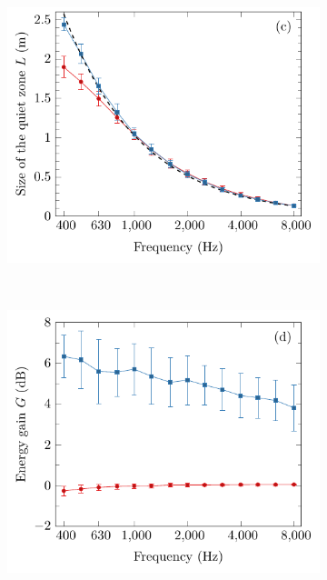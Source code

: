 \begin{figure}[!htb]
\begin{subfigure}{0.32\textwidth}
        \centering
        \includegraphics[width = \textwidth]{fig/200404B_size_v2}
    \end{subfigure}
    \\
    \begin{subfigure}{0.32\textwidth}
        \centering
        \includegraphics[width = \textwidth]{fig/200404A_gain_v2}
    \end{subfigure}
    \begin{subfigure}{0.32\textwidth}
        \centering

\end{subfigure}
\end{figure}
